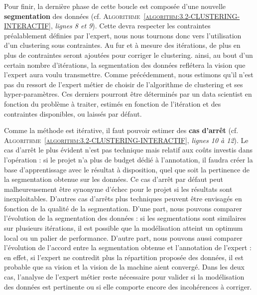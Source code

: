		Pour finir, la dernière phase de cette boucle est composée d'une nouvelle \textbf{segmentation} des données (cf. \textsc{Algorithme~\ref{algorithm:3.2-CLUSTERING-INTERACTIF}}, \textit{lignes 8 et 9}). Cette devra respecter les contraintes préalablement définies par l'expert, nous nous tournons donc vers l'utilisation d'un clustering sous contraintes.
		Au fur et à mesure des itérations, de plus en plus de contraintes seront ajoutées pour corriger le clustering. ainsi, au bout d'un certain nombre d'itérations, la segmentation des données reflétera la vision que l'expert aura voulu transmettre.
		Comme précédemment, nous estimons qu'il n'est pas du ressort de l'expert métier de choisir de l'algorithme de clustering et ses hyper-paramètres. Ces derniers pourront être déterminés par un data scientist en fonction du problème à traiter, estimés en fonction de l'itération et des contraintes disponibles, ou laissés par défaut.
		
		Comme la méthode est itérative, il faut pouvoir estimer des \textbf{cas d'arrêt} (cf. \textsc{Algorithme~\ref{algorithm:3.2-CLUSTERING-INTERACTIF}}, \textit{lignes 10 à 12}).
		Le cas d'arrêt le plus évident n'est pas technique mais relatif aux coûts investis dans l'opération : si le projet n'a plus de budget dédié à l'annotation, il faudra créer la base d'apprentissage avec le résultat à disposition, quel que soit la pertinence de la segmentation obtenue sur les données. Ce cas d'arrêt par défaut peut malheureusement être synonyme d'échec pour le projet si les résultats sont inexploitables.
		D'autres cas d'arrêts plus techniques peuvent être envisagés en fonction de la qualité de la segmentation.
		D'une part, nous pouvons comparer l'évolution de la segmentation des données : si les segmentations sont similaires sur plusieurs itérations, il est possible que la modélisation atteint un optimum local ou un palier de performance.
		D'autre part, nous pouvons aussi comparer l'évolution de l'accord entre la segmentation obtenue et l'annotation de l'expert : en effet, si l'expert ne contredit plus la répartition proposée des données, il est probable que sa vision et la vision de la machine aient convergé.
		Dans les deux cas, l'analyse de l'expert métier reste nécessaire pour valider si la modélisation des données est pertinente ou si elle comporte encore des incohérences à corriger.


